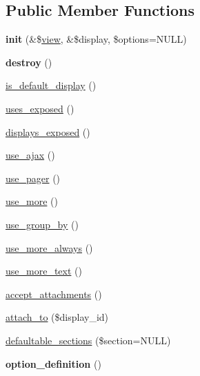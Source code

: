 \subsection*{Public Member Functions}
\begin{DoxyCompactItemize}
\item 
\hypertarget{classviews__plugin__display_a354777723ab7573e8a4039259e447f7d}{
{\bfseries init} (\&\$\hyperlink{classview}{view}, \&\$display, \$options=NULL)}
\label{classviews__plugin__display_a354777723ab7573e8a4039259e447f7d}

\item 
\hypertarget{classviews__plugin__display_a222ef7c9c8ed3c3d36517a719568cefe}{
{\bfseries destroy} ()}
\label{classviews__plugin__display_a222ef7c9c8ed3c3d36517a719568cefe}

\item 
\hyperlink{classviews__plugin__display_a4f4562c1d689d8d3494b78d676249732}{is\_\-default\_\-display} ()
\item 
\hyperlink{classviews__plugin__display_a5bfcb22187618f52bea9ea626aff18a4}{uses\_\-exposed} ()
\item 
\hyperlink{classviews__plugin__display_a47058532874d0bc5448b53e0a98489cc}{displays\_\-exposed} ()
\item 
\hyperlink{classviews__plugin__display_a7983d89c2a4aabab1df7ceb31d700a3c}{use\_\-ajax} ()
\item 
\hyperlink{classviews__plugin__display_aaae358d9672426a81a1733a0236019b8}{use\_\-pager} ()
\item 
\hyperlink{classviews__plugin__display_ae1d8ce3a491253cd56c5e8fc1d62c008}{use\_\-more} ()
\item 
\hyperlink{classviews__plugin__display_a89f5d783ace86904c3eac7ad114e4b18}{use\_\-group\_\-by} ()
\item 
\hyperlink{classviews__plugin__display_aaa957375d149f787d53ba6b187dc35bf}{use\_\-more\_\-always} ()
\item 
\hyperlink{classviews__plugin__display_a1681009bc05853c13f13e24ee94c2800}{use\_\-more\_\-text} ()
\item 
\hyperlink{classviews__plugin__display_af94245cf0dde1c883d9b3dc3760dbc9c}{accept\_\-attachments} ()
\item 
\hyperlink{classviews__plugin__display_aa74683048bca4e740cb7e25ae4c527d4}{attach\_\-to} (\$display\_\-id)
\item 
\hyperlink{classviews__plugin__display_a1ff9cd1b5762dde8765e608efdec8ec4}{defaultable\_\-sections} (\$section=NULL)
\item 
\hypertarget{classviews__plugin__display_a6eb433a3ccd4225c11b54955d86e2e01}{
{\bfseries option\_\-definition} ()}
\label{classviews__plugin__display_a6eb433a3ccd4225c11b54955d86e2e01}


\end{DoxyCompactItemize}
